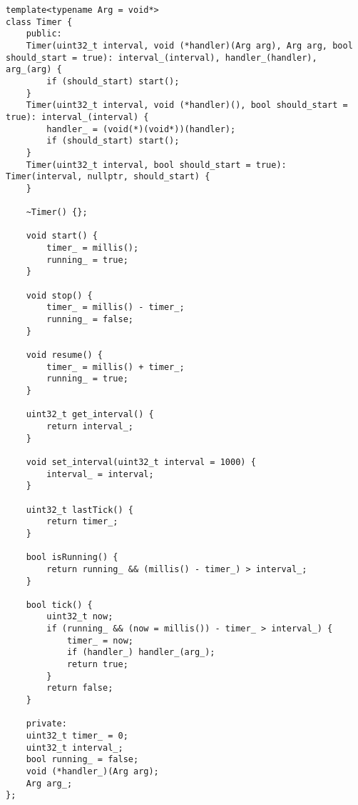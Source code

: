 \begin{lstlisting}[style=cpp-small, caption=Клас Timer, label=lst:timer]
template<typename Arg = void*>
class Timer {
    public:
    Timer(uint32_t interval, void (*handler)(Arg arg), Arg arg, bool should_start = true): interval_(interval), handler_(handler), arg_(arg) {
        if (should_start) start();
    }
    Timer(uint32_t interval, void (*handler)(), bool should_start = true): interval_(interval) {
        handler_ = (void(*)(void*))(handler);
        if (should_start) start();
    }
    Timer(uint32_t interval, bool should_start = true): Timer(interval, nullptr, should_start) {
    }

    ~Timer() {};

    void start() {
        timer_ = millis();
        running_ = true;
    }

    void stop() {
        timer_ = millis() - timer_;
        running_ = false;
    }

    void resume() {
        timer_ = millis() + timer_;
        running_ = true;
    }

    uint32_t get_interval() {
        return interval_;
    }

    void set_interval(uint32_t interval = 1000) {
        interval_ = interval;
    }

    uint32_t lastTick() {
        return timer_;
    }

    bool isRunning() {
        return running_ && (millis() - timer_) > interval_;
    }

    bool tick() {
        uint32_t now;
        if (running_ && (now = millis()) - timer_ > interval_) {
            timer_ = now;
            if (handler_) handler_(arg_);
            return true;
        }
        return false;
    }

    private:
    uint32_t timer_ = 0;
    uint32_t interval_;
    bool running_ = false;
    void (*handler_)(Arg arg);
    Arg arg_;
};
\end{lstlisting}
